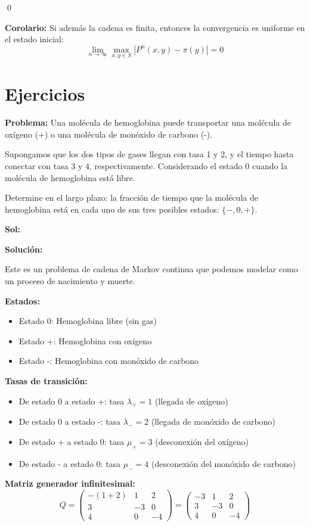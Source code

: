 \documentclass[12pt,a4paper]{article}
\begin{document}
\qed

\textbf{Corolario:} Si además la cadena es finita, entonces la convergencia es uniforme en el estado inicial:
\begin{equation*}
\lim_{n \to \infty} \max_{x,y \in S} |P^n(x,y) - \pi(y)| = 0
\end{equation*}

\section{Ejercicios}

\textbf{Problema:} Una molécula de hemoglobina puede transportar una molécula de oxígeno (+) o una molécula de monóxido de carbono (-).

Supongamos que los dos tipos de gases llegan con tasa 1 y 2, y el tiempo hasta conectar con tasa 3 y 4, respectivamente. Considerando el estado 0 cuando la molécula de hemoglobina está libre.

Determine en el largo plazo: la fracción de tiempo que la molécula de hemoglobina está en cada uno de sus tres posibles estados: $\{-, 0, +\}$.

\textbf{Sol:}

\textbf{Solución:}

Este es un problema de cadena de Markov continua que podemos modelar como un proceso de nacimiento y muerte.

\textbf{Estados:}
\begin{itemize}
\item Estado 0: Hemoglobina libre (sin gas)
\item Estado +: Hemoglobina con oxígeno
\item Estado -: Hemoglobina con monóxido de carbono
\end{itemize}

\textbf{Tasas de transición:}
\begin{itemize}
\item De estado 0 a estado +: tasa $\lambda_+ = 1$ (llegada de oxígeno)
\item De estado 0 a estado -: tasa $\lambda_- = 2$ (llegada de monóxido de carbono)
\item De estado + a estado 0: tasa $\mu_+ = 3$ (desconexión del oxígeno)
\item De estado - a estado 0: tasa $\mu_- = 4$ (desconexión del monóxido de carbono)
\end{itemize}

\textbf{Matriz generador infinitesimal:}
\begin{equation*}
Q = \begin{pmatrix}
-(1+2) & 1 & 2 \\
3 & -3 & 0 \\
4 & 0 & -4
\end{pmatrix} = \begin{pmatrix}
-3 & 1 & 2 \\
3 & -3 & 0 \\
4 & 0 & -4
\end{pmatrix}
\end{equation*}
\end{document}
